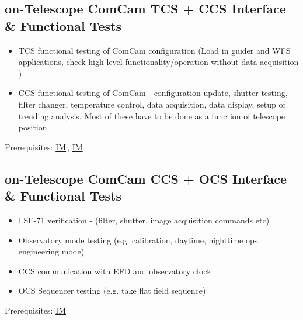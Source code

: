 \documentclass[SE,authoryear,toc]{lsstdoc}
\newcommand{\IM}[1]{\hyperref[IM:#1]{\color{blue}IM$_{\text{\csname nameIM#1\endcsname}}$}}
\begin{document}
\subsection{on-Telescope ComCam TCS + CCS Interface \& Functional Tests}

\begin{itemize}
\item
  TCS functional testing of ComCam configuration (Load in guider and WFS applications, check high level functionality/operation without data acquisition )
\item
  CCS functional testing of ComCam - configuration update, shutter testing, filter changer, temperature control, data acquisition, data display, setup of trending analysis. Most of these have to be done as a function of telescope position
\end{itemize}
Prerequisites: \IM{b}, \IM{g}

\subsection{on-Telescope ComCam CCS + OCS Interface \& Functional Tests}

\begin{itemize}
\item LSE-71 verification - (filter, shutter, image acquisition commands etc)
\item Observatory mode testing (e.g. calibration, daytime, nighttime ops, engineering mode)
\item CCS communication with EFD and observatory clock
\item OCS Sequencer testing (e.g. take flat field sequence)
\end{itemize}
Prerequisites: \IM{b}
\end{document}
